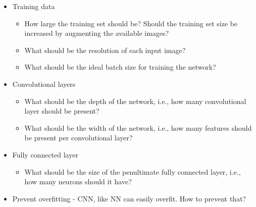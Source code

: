 \documentclass{article} %
\begin{document}
\begin{itemize}
\item
Training data 
	\begin{itemize}
		\item
		How large the training set should be? Should the training set size be increased by augmenting the available images?
		\item
		What should be the resolution of each input image? 
		\item
		What should be the ideal batch size for training the network? 
	\end{itemize}	

\item
Convolutional layers
	\begin{itemize}
		\item
		What should be the depth of the network, i.e., how many convolutional layer should be present?
		\item
		What should be the width of the network, i.e., how many features should be present per convolutional layer?
	\end{itemize}

\item
Fully connected layer
	\begin{itemize}
		\item 
		What should be the size of the penultimate fully connected layer, i.e., how many neurons should it have?
	\end{itemize}

\item
Prevent overfitting - CNN, like NN can easily overfit. How to prevent that? 
\end{itemize} 
\end{document}
